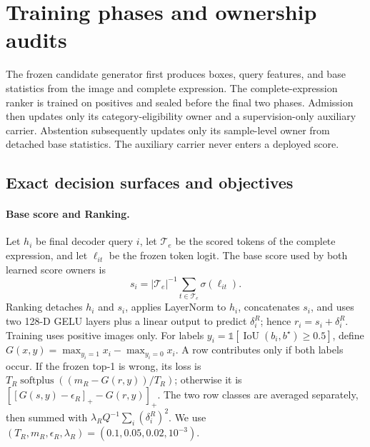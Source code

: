 \section{Training phases and ownership audits}
\label{sup:ownership}

The frozen candidate generator first produces boxes, query features, and base
statistics from the image and complete expression.  The complete-expression
ranker is trained on positives and sealed before the final two phases.
Admission then updates only its category-eligibility owner and a
supervision-only
auxiliary carrier.  Abstention subsequently updates only its sample-level
owner from detached base statistics.  The auxiliary carrier never enters a
deployed score.

\subsection{Exact decision surfaces and objectives}
\label{sup:objectives}

\paragraph{Base score and Ranking.}
Let $h_i$ be final decoder query $i$, let $\mathcal T_e$ be the scored tokens
of the complete expression, and let $\ell_{it}$ be the frozen token logit.  The
base score used by both learned score owners is
\begin{equation}
 s_i=|\mathcal T_e|^{-1}\sum_{t\in\mathcal T_e}\sigma(\ell_{it}).
 \label{eq:supp-base-score}
\end{equation}
Ranking detaches $h_i$ and $s_i$, applies LayerNorm to $h_i$, concatenates
$s_i$, and uses two 128-D GELU layers plus a linear output to predict
$\delta_i^R$; hence $r_i=s_i+\delta_i^R$.  Training uses positive images only.
For labels $y_i=\mathbb 1[\operatorname{IoU}(b_i,b^\star)\geq0.5]$, define
$G(x,y)=\max_{y_i=1}x_i-\max_{y_i=0}x_i$.  A row contributes only if both
labels occur.  If the frozen top-1 is wrong, its loss is
$T_R\operatorname{softplus}((m_R-G(r,y))/T_R)$; otherwise it is
$[[G(s,y)-\epsilon_R]_+-G(r,y)]_+$.  The two row classes are averaged
separately, then summed with
$\lambda_R Q^{-1}\sum_i(\delta_i^R)^2$.  We use
$(T_R,m_R,\epsilon_R,\lambda_R)=(0.1,0.05,0.02,10^{-3})$.

